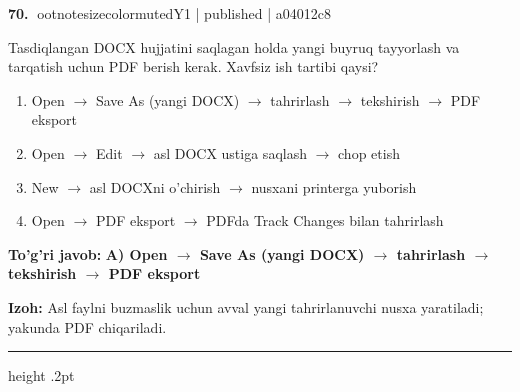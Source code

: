 \documentclass[10pt,a4paper]{article}
\begin{document}
\textbf{\color{ink}70.} {ootnotesizecolor{muted}Y1 | published | a04012c8}
\par
Tasdiqlangan DOCX hujjatini saqlagan holda yangi buyruq tayyorlash va tarqatish uchun PDF berish kerak. Xavfsiz ish tartibi qaysi?
\begin{enumerate}[label=\Alph*),leftmargin=9mm]
\item Open \ensuremath{\rightarrow} Save As (yangi DOCX) \ensuremath{\rightarrow} tahrirlash \ensuremath{\rightarrow} tekshirish \ensuremath{\rightarrow} PDF eksport
\item Open \ensuremath{\rightarrow} Edit \ensuremath{\rightarrow} asl DOCX ustiga saqlash \ensuremath{\rightarrow} chop etish
\item New \ensuremath{\rightarrow} asl DOCXni o'chirish \ensuremath{\rightarrow} nusxani printerga yuborish
\item Open \ensuremath{\rightarrow} PDF eksport \ensuremath{\rightarrow} PDFda Track Changes bilan tahrirlash
\end{enumerate}
\begin{tcolorbox}[enhanced,breakable,colback=teal!4,colframe=teal!55!black,boxrule=0.45pt,arc=1.2mm,left=2.8mm,right=2.8mm,top=2mm,bottom=2mm]
\textbf{\color{teal}To'g'ri javob:} \textbf{A) Open \ensuremath{\rightarrow} Save As (yangi DOCX) \ensuremath{\rightarrow} tahrirlash \ensuremath{\rightarrow} tekshirish \ensuremath{\rightarrow} PDF eksport}
\par\smallskip
\textbf{Izoh:} Asl faylni buzmaslik uchun avval yangi tahrirlanuvchi nusxa yaratiladi; yakunda PDF chiqariladi.
\end{tcolorbox}
\vspace{2mm}\hrule height .2pt\vspace{2mm}
\end{document}
